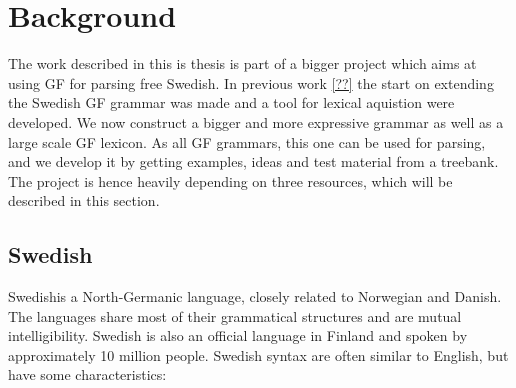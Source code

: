 \documentclass{report}
\begin{document}


\section{Background}  
The work described in this is thesis is part of a bigger project which aims at
using GF for parsing free Swedish. 
In previous work \ref{??} the start on extending the Swedish GF grammar was
made and a tool for lexical aquistion were developed.
We now construct a bigger
and more expressive grammar as well as a large scale GF lexicon.
As all GF grammars, this one can be used for parsing, and we develop it by getting
examples, ideas and test material from a treebank.
The project is hence heavily depending on three resources, which will be described
in this section.


\subsection{Swedish}
Swedish\cite[Inl. ]{SAG}is a North-Germanic language,
closely related to Norwegian and Danish. The languages share most of their
grammatical structures and are mutual intelligibility. Swedish is also 
an official language in Finland and spoken by approximately 10 million people.
Swedish syntax are often similar to English, but have some characteristics:
\end{document}
